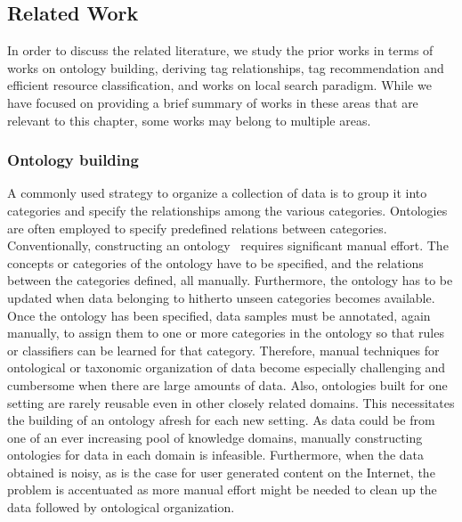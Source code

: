 \subsection{Related Work}
\label{sub_sec:relatedWork}


In order to discuss the related literature, we study the prior works in terms of works on ontology building, deriving tag relationships, tag recommendation and efficient resource classification, and works on local search paradigm. While we have focused on providing a brief summary of works in these areas that are relevant to this chapter, some works may belong to multiple areas. \\ 

\subsubsection{Ontology building}
A commonly used strategy to organize a collection of data is to group it into categories and specify the relationships among the various categories. Ontologies~\cite{fensel2001ontologies}  are often employed to specify predefined relations between categories. Conventionally, constructing an ontology~\cite{gruber1995toward} requires significant manual effort. The concepts or categories of the ontology have to be specified, and the relations between the categories defined, all manually. Furthermore, the ontology has to be updated when data belonging to hitherto unseen categories becomes available. Once the ontology has been specified, data samples must be annotated, again manually, to assign them to one or more categories in the ontology so that rules or classifiers can be learned for that category. Therefore, manual techniques for ontological or taxonomic organization of data become especially challenging and cumbersome when there are large amounts of data. Also, ontologies built for one setting are rarely reusable even in other closely related domains. This necessitates the building of an ontology afresh for each new setting. As data could be from one of an ever increasing pool of knowledge domains, manually constructing ontologies for data in each domain is infeasible.  Furthermore, when the data obtained is noisy, as is the case for user generated content on the Internet, the problem is accentuated as more manual effort might be needed to clean up the data followed by ontological organization. 

